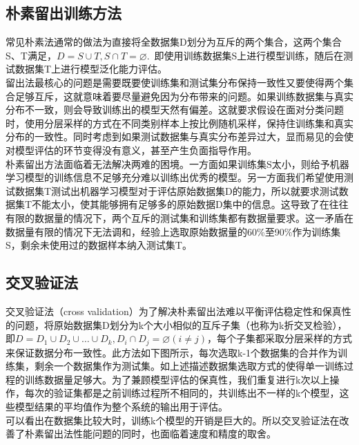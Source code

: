  \subsection{朴素留出训练方法}
 \indent 常见朴素法通常的做法为直接将全数据集D划分为互斥的两个集合，这两个集合S、T满足，$D=S \cup T, S \cap T=\varnothing$.~即使用训练数据集S上进行模型训练，随后在测试数据集T上进行模型泛化能力评估。\\
 \indent 留出法最核心的问题是需要既要使训练集和测试集分布保持一致性又要使得两个集合足够互斥，这就意味着要尽量避免因为分布带来的问题。如果训练数据集与真实分布不一致，则会导致训练出的模型天然有偏差。这就要求假设在面对分类问题时，使用分层采样的方式在不同类别样本上按比例随机采样，保持住训练集和真实分布的一致性。同时考虑到如果测试数据集与真实分布差异过大，显而易见的会使对模型评估的环节变得没有意义，甚至产生负面指导作用。\\
 \indent 朴素留出方法面临着无法解决两难的困境。一方面如果训练集S太小，则给予机器学习模型的训练信息不足够充分难以训练出优秀的模型。另一方面我们希望使用测试数据集T测试出机器学习模型对于评估原始数据集D的能力，所以就要求测试数据集T不能太小，使其能够拥有足够多的原始数据D集中的信息。这导致了在往往有限的数据量的情况下，两个互斥的测试集和训练集都有数据量要求。这一矛盾在数据量有限的情况下无法调和，经验上选取原始数据量的60\%至90\%作为训练集S，剩余未使用过的数据样本纳入测试集T。\\
 \subsection{交叉验证法}
 \indent 交叉验证法（cross validation）为了解决朴素留出法难以平衡评估稳定性和保真性的问题，将原始数据集D划分为k个大小相似的互斥子集（也称为k折交叉检验），即$D=D_{1} \cup D_{2} \cup \ldots \cup D_{k}, D_{i} \cap D_{j}=\varnothing(i \neq j)$，每个子集都采取分层采样的方式来保证数据分布一致性。此方法如下图所示，每次选取k-1个数据集的合并作为训练集，剩余一个数据集作为测试集。如上述描述数据集选取方式的使得单一训练过程的训练数据量足够大。为了兼顾模型评估的保真性，我们重复进行k次以上操作，每次的验证集都是之前训练过程所不相同的，共训练出不一样的k个模型，这些模型结果的平均值作为整个系统的输出用于评估。\\
 \indent 可以看出在数据集比较大时，训练k个模型的开销是巨大的。所以交叉验证法在改善了朴素留出法性能问题的同时，也面临着速度和精度的取舍。\\

